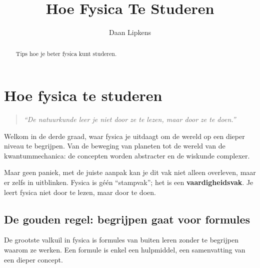 \documentclass{ximera}
\title{Hoe Fysica Te Studeren}
\author{Daan Lipkens}
\begin{document}
\begin{abstract}
    Tips hoe je beter fysica kunt studeren.
\end{abstract}
\maketitle


\section{Hoe fysica te studeren}
\begin{quote}
\textit{“De natuurkunde leer je niet door ze te lezen, maar door ze te doen.”}
\end{quote}

Welkom in de derde graad, waar fysica je uitdaagt om de wereld op een dieper niveau te begrijpen.  
Van de beweging van planeten tot de wereld van de kwantummechanica: de concepten worden abstracter en de wiskunde complexer.  

Maar geen paniek, met de juiste aanpak kan je dit vak niet alleen overleven, maar er zelfs in uitblinken.  
Fysica is géén “stampvak”; het is een \textbf{vaardigheidsvak}.  
Je leert fysica niet door te lezen, maar door te doen.


\subsection{De gouden regel: begrijpen gaat voor formules}

\begin{fact}[] %
De grootste valkuil in fysica is formules van buiten leren zonder te begrijpen waarom ze werken.  
Een formule is enkel een hulpmiddel, een samenvatting van een dieper concept.
\end{fact}
\end{document}
